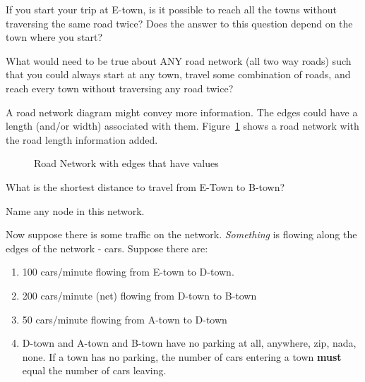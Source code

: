 \begin{clevel}
If you start your trip at E-town, is it possible to reach all the towns without traversing the same road twice? Does the answer to this question depend on the town where you start?
\end{clevel}

\begin{dlevel}
What would need to be true about ANY road network (all two way roads) such that you could always start at any town, travel some combination of roads, and reach every town without traversing any road twice?
\end{dlevel}

A road network diagram might convey more information. The edges could have a length (and/or width) associated with them. Figure~\ref{F:1RNb} shows a road network with the road length information added. 

\par
\begin{figure}[H]
\begin{center}
\caption{Road Network with edges that have values}
\label{F:1RNb}
\end{center}
\end{figure}

\begin{alevel}
What is the shortest distance to travel from E-Town to B-town?
\end{alevel}
\begin{alevel}
Name any node in this network.
\end{alevel}
\noindent
Now suppose there is some traffic on the network. \emph{Something} is flowing along the edges of the network - cars. Suppose there are:
\begin{enumerate}
\item 100 cars/minute flowing from E-town to D-town.  
\item 200 cars/minute (net) flowing from D-town to B-town
\item 50 cars/minute flowing from A-town to D-town
\item D-town and A-town and B-town have no parking at all, anywhere, zip, nada, none. If a town has no parking, the number of cars entering a town \textbf{must} equal the number of cars leaving.
\end{enumerate}

